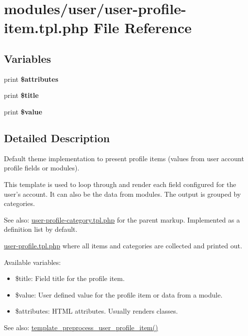\hypertarget{user-profile-item_8tpl_8php}{
\section{modules/user/user-profile-item.tpl.php File Reference}
\label{user-profile-item_8tpl_8php}
}
\subsection*{Variables}
\begin{CompactItemize}
\item 
\hypertarget{user-profile-item_8tpl_8php_9c88c4272fa40546577b45392a0b3cd3}{
print \textbf{\$attributes}}
\label{user-profile-item_8tpl_8php_9c88c4272fa40546577b45392a0b3cd3}

\item 
\hypertarget{user-profile-item_8tpl_8php_ec2795512d255332f57cacd930a090b4}{
print \textbf{\$title}}
\label{user-profile-item_8tpl_8php_ec2795512d255332f57cacd930a090b4}

\item 
\hypertarget{user-profile-item_8tpl_8php_a63ba310044cc87231df10757a908a52}{
print \textbf{\$value}}
\label{user-profile-item_8tpl_8php_a63ba310044cc87231df10757a908a52}

\end{CompactItemize}


\subsection{Detailed Description}
Default theme implementation to present profile items (values from user account profile fields or modules).

This template is used to loop through and render each field configured for the user's account. It can also be the data from modules. The output is grouped by categories.

\begin{Desc}
\item[See also:]\hyperlink{user-profile-category_8tpl_8php}{user-profile-category.tpl.php} for the parent markup. Implemented as a definition list by default. 

\hyperlink{user-profile_8tpl_8php}{user-profile.tpl.php} where all items and categories are collected and printed out.\end{Desc}
Available variables:\begin{itemize}
\item \$title: Field title for the profile item.\item \$value: User defined value for the profile item or data from a module.\item \$attributes: HTML attributes. Usually renders classes.\end{itemize}


\begin{Desc}
\item[See also:]\hyperlink{user_8pages_8inc_b6e6ed16b5647c626cc0468506abd3e9}{template\_\-preprocess\_\-user\_\-profile\_\-item()} \end{Desc}
